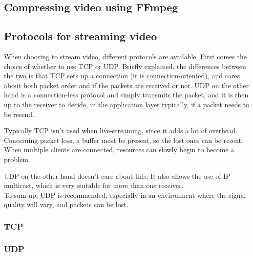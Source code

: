 \subsection{Compressing video using FFmpeg}


\subsection{Protocols for streaming video}
When choosing to stream video, different protocols are available. First comes the choice of whether to use TCP or UDP. Briefly explained, the differences between the two is that TCP sets up a connection (it is connection-oriented), and cares about both packet order and if the packets are received or not. UDP on the other hand is a connection-less protocol and simply transmits the packet, and it is then up to the receiver to decide, in the application layer typically, if a packet needs to be resend.

Typically TCP isn't used when live-streaming, since it adds a lot of overhead. Concerning packet loss, a buffer most be present, so the lost ones can be resent. When multiple clients are connected, resources can slowly begin to become a problem.

UDP on the other hand doesn't care about this. It also allows the use of IP multicast, which is very suitable for more than one receiver.\\

To sum up, UDP is recommended, especially in an environment where the signal quality will vary, and packets can be lost.

\subsubsection{TCP}

\subsubsection{UDP}




